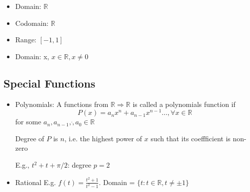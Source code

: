 \documentclass{report}
\begin{document}
     {
      \begin{itemize}
        \item Domain:  $\mathbb{R}$
        \item Codomain:  $\mathbb{R}$
        \item Range: $[-1,1]$
      \end{itemize}
    }
     {
      \begin{itemize}
        \item Domain: x, $x \in \mathbb{R}, x \neq 0$
      \end{itemize}
    }
    \subsection{Special Functions}%
    \begin{itemize}
      \item Polynomials: A functions from $\mathbb{R} \Rightarrow \mathbb{R}$
        is called a polynomials function if 
        \[P(x) = a_nx^n + a_{n-1}x^{n-1} \dots, \forall x \in \mathbb{R}\]
        for some $a_n, a_{n-1}, \dot, a_0 \in \mathbb{R}$

        Degree of $P$ is $n$, i.e. the highest power of $x$ such that its
        coeffficient is non-zero

        E.g., $t^2 + t + \pi/2$: degree $p=2$
      \item Rational 
        E.g. $f(t) = \frac{t^2+1}{t^2-1} $.  Domain = $\{t: t \in
        \mathbb{R}, t \neq \pm 1\}$
        
    \end{itemize}
\end{document}

